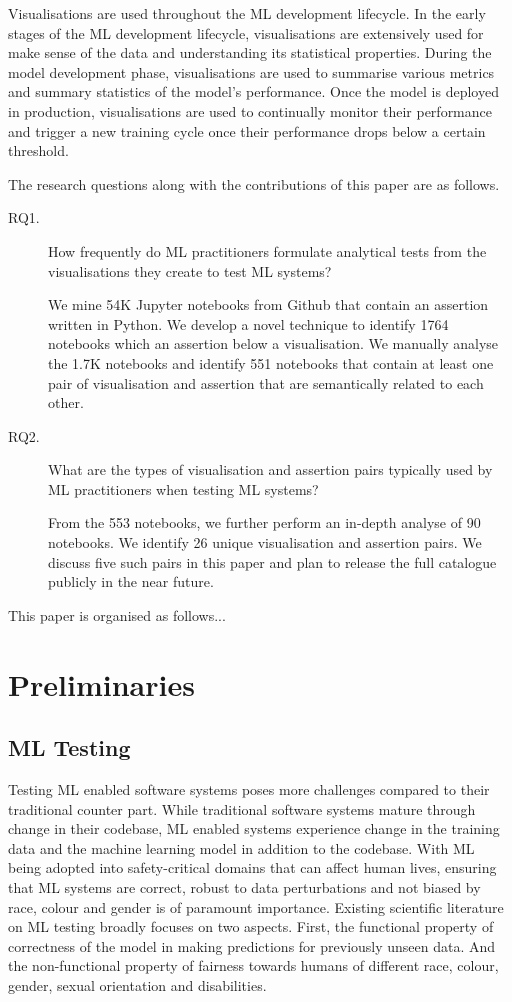 \documentclass[acmsmall,screen,review,anonymous]{acmart}
\begin{document}
Visualisations are used throughout the ML development lifecycle. In the early stages of the ML development lifecycle, visualisations are extensively used for make sense of the data and understanding its statistical properties. During the model development phase, visualisations are used to summarise various metrics and summary statistics of the model's performance. Once the model is deployed in production, visualisations are used to continually monitor their performance and trigger a new training cycle once their performance drops below a certain threshold.

The research questions along with the contributions of this paper are as follows.
\begin{description}
\item[RQ1.] How frequently do ML practitioners formulate analytical tests from the visualisations they create to test ML systems?

We mine 54K Jupyter notebooks from Github that contain an assertion written in Python. We develop a novel technique to identify 1764 notebooks which an assertion below a visualisation. We manually analyse the 1.7K notebooks and identify 551 notebooks that contain at least one pair of visualisation and assertion that are semantically related to each other.

\item[RQ2.] What are the types of visualisation and assertion pairs typically used by ML practitioners when testing ML systems?

From the 553 notebooks, we further perform an in-depth analyse of 90 notebooks. We identify 26 unique visualisation and assertion pairs. We discuss five such pairs in this paper and plan to release the full catalogue publicly in the near future.

\end{description}

This paper is organised as follows...

\section{Preliminaries}\label{sec:prelim}

\subsection{ML Testing}\label{sec:ml-testing}

Testing ML enabled software systems poses more challenges compared to their traditional counter part. While traditional software systems mature through change in their codebase, ML enabled systems experience change in the training data and the machine learning model in addition to the codebase. With ML being adopted into safety-critical domains that can affect human lives, ensuring that ML systems are correct, robust to data perturbations and not biased by race, colour and gender is of paramount importance. Existing scientific literature on ML testing broadly focuses on two aspects. First, the functional property of correctness of the model in making predictions for previously unseen data. And the non-functional property of fairness towards humans of different race, colour, gender, sexual orientation and disabilities.
\end{document}
